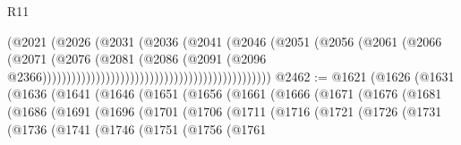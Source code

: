 \begin{lexlean}{R11}
\begin{coremodule}
{{{{{{{{{{{{{{{{{{{{{{{{{{{{{{{{{{{{{{{{{{{{{{{{{{{{{{{{{{{{{{{{{{{{{{{{{{{{{{{{{{{{{{{{{{{{{{{{{{{{{{{{{{                                                                  (@2021
                                                                    (@2026
                                                                      (@2031
                                                                        (@2036
                                                                          (@2041
                                                                            (@2046
                                                                              (@2051
                                                                                (@2056
                                                                                  (@2061
                                                                                    (@2066
                                                                                      (@2071
                                                                                        (@2076
                                                                                          (@2081
                                                                                            (@2086
                                                                                              (@2091
                                                                                                (@2096
                                                                                                  @2366)))))))))))))))))))))))))))))))))))))))))))))))
@2462 := @1621
    (@1626
      (@1631
        (@1636
          (@1641
            (@1646
              (@1651
                (@1656
                  (@1661
                    (@1666
                      (@1671
                        (@1676
                          (@1681
                            (@1686
                              (@1691
                                (@1696
                                  (@1701
                                    (@1706
                                      (@1711
                                        (@1716
                                          (@1721
                                            (@1726
                                              (@1731
                                                (@1736
                                                  (@1741
                                                    (@1746
                                                      (@1751
                                                        (@1756
                                                          (@1761
}}}}}}}}}}}}}}}}}}}}}}}}}}}}}}}}}}}}}}}}}}}}}}}}}}}}}}}}}}}}}}}}}}}}}}}}}}}}}}}}}}}}}}}}}}}}}}}}}}}}}}}}}}
\end{coremodule}
\end{lexlean}
